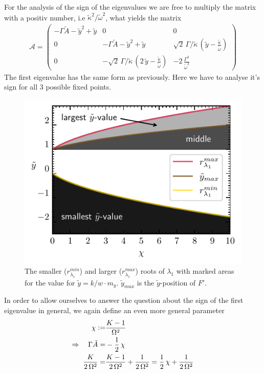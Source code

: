 \documentclass{article}
\begin{document}
For the analysis of the sign of the eigenvalues we are free to multiply the matrix with a positiv number, i.e $\tilde{\kappa}^2/\tilde{\omega}^2$, what yields the matrix
\begin{align*}
    \mathcal{A}=\left( \begin{array}{ccc}
        -\Gamma\tilde{A}-\tilde{y}^2+\tilde{y}&  0 & 0\\
        0 & -\Gamma\tilde{A}-\tilde{y}^2+\tilde{y}& \sqrt{2}\,\Gamma/\tilde{\kappa}\,(\tilde{y}-\frac{\tilde{\kappa}}{\tilde{\omega}})\\
        0 &  -\sqrt{2}\,\Gamma/\tilde{\kappa}\,(2\,\tilde{y}-\frac{\tilde{\kappa}}{\tilde{\omega}}) & -2\,\frac{\Gamma^2}{\tilde{\omega}^2}
    \end{array} \right)
\end{align*}
The first eigenvalue has the same form as previously. Here we have to analyse it's sign for all 3 possible fixed points.\newpage
\begin{figure}
    \includegraphics{pictures/sign_of_ev1.pdf}
    \vspace*{-2cm}\caption{The smaller ($r_{\lambda_1}^{min}$) and larger ($r_{\lambda_1}^{max}$) roots of $\lambda_1$ with marked areas for the value for $\tilde{y}=k/w\cdot m_y$. $\tilde{y}_{max}$ is the $\tilde{y}$-position of $F'$.}
    \label{fig:sign_lam1}
\end{figure}
In order to allow ourselves to answer the question about the sign of the first eigenvalue in general, we again define an even more general parameter
\begin{align*}
    \chi\vcentcolon=&\frac{K-1}{\Omega^2}\\
    \Rightarrow\quad\Gamma\tilde{A}=&-\frac{1}{2}\,\chi\\
    \frac{K}{2\,\Omega^2}=&\frac{K-1}{2\,\Omega^2}+\frac{1}{2\,\Omega^2}=\frac{1}{2}\,\chi+\frac{1}{2\,\Omega^2}
\end{align*}
\end{document}
